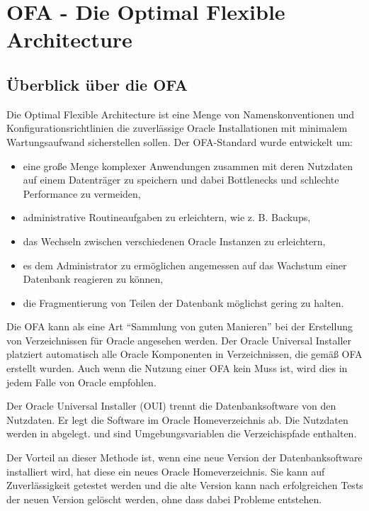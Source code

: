     \section{OFA - Die Optimal Flexible Architecture}
      \subsection{Überblick über die OFA}
        Die Optimal Flexible Architecture ist eine Menge von Namenskonventionen und Konfigurationsrichtlinien die zuverlässige Oracle Installationen mit minimalem Wartungsaufwand sicherstellen sollen. Der OFA-Standard wurde entwickelt um:
        \begin{itemize}
          \item eine große Menge komplexer Anwendungen zusammen mit deren Nutzdaten auf einem Datenträger zu speichern und dabei Bottlenecks und schlechte Performance zu vermeiden,
          \item administrative Routineaufgaben zu erleichtern, wie z. B. Backups,
          \item das Wechseln zwischen verschiedenen Oracle Instanzen zu erleichtern,
          \item es dem Administrator zu ermöglichen angemessen auf das Wachstum einer Datenbank reagieren zu können,
          \item die Fragmentierung von Teilen der Datenbank möglichst gering zu halten.
        \end{itemize}
        Die OFA kann als eine Art \enquote{Sammlung von guten Manieren} bei der Erstellung von Verzeichnissen für Oracle angesehen werden. Der Oracle Universal Installer platziert automatisch alle Oracle Komponenten in Verzeichnissen, die gemäß OFA erstellt wurden. Auch wenn die Nutzung einer OFA kein Muss ist, wird dies in jedem Falle von Oracle empfohlen.

        Der Oracle Universal Installer (OUI) trennt die Datenbanksoftware von den Nutzdaten. Er legt die Software im Oracle Homeverzeichnis  ab. Die Nutzdaten werden in  abgelegt.  und  sind Umgebungsvariablen die Verzeichispfade enthalten.

        Der Vorteil an dieser Methode ist, wenn eine neue Version der Datenbanksoftware installiert wird, hat diese ein neues Oracle Homeverzeichnis. Sie kann auf Zuverlässigkeit getestet werden und die alte Version kann nach erfolgreichen Tests der neuen Version gelöscht werden, ohne dass dabei Probleme entstehen.
